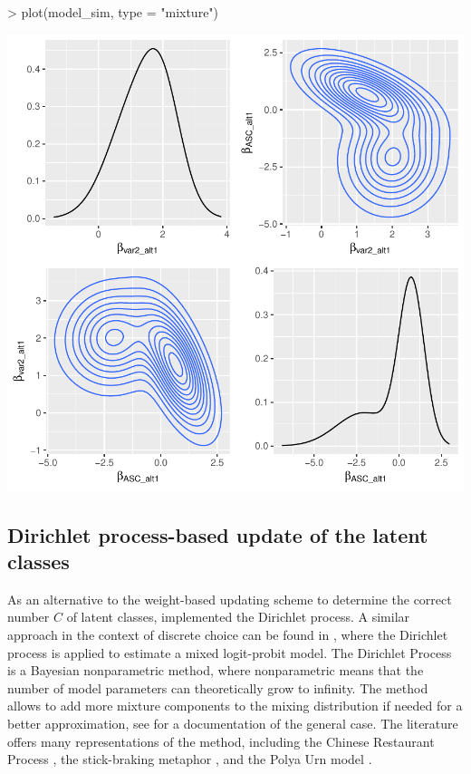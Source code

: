 \documentclass[article]{jss}
\begin{document}
\begin{Schunk}
\begin{Sinput}
> plot(model_sim, type = "mixture")
\end{Sinput}
\end{Schunk}
\includegraphics{rprobitb_oelschlaeger_bauer-model-sim-mixture}

\subsection{Dirichlet process-based update of the latent classes} \label{subsec:dp_update}

As an alternative to the weight-based updating scheme to determine the correct number $C$ of latent classes,  implemented the Dirichlet process. A similar approach in the context of discrete choice can be found in \cite{Burda:2008}, where the Dirichlet process is applied to estimate a mixed logit-probit model. The Dirichlet Process is a Bayesian nonparametric method, where nonparametric means that the number of model parameters can theoretically grow to infinity. The method allows to add more mixture components to the mixing distribution if needed for a better approximation, see \cite{Neal:2000} for a documentation of the general case. The literature offers many representations of the method, including the Chinese Restaurant Process \citep{Aldous:1985}, the stick-braking metaphor \citep{Sethuraman:1994}, and the Polya Urn model \citep{Blackwell:1973}.
\end{document}
